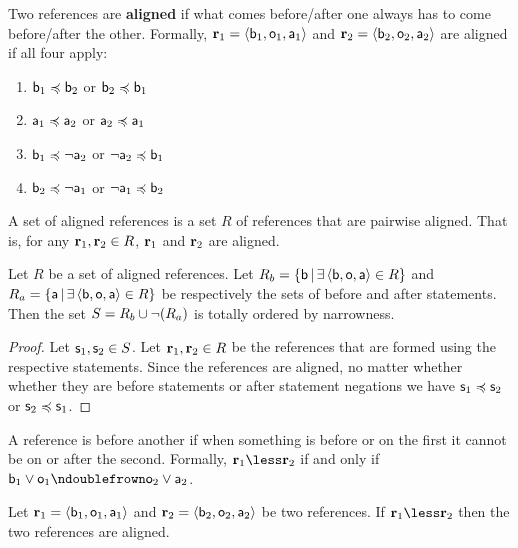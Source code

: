 \documentclass[11pt,letterpaper,fleqn]{memoir} %
\begin{document}
\begin{mathSection}
	\begin{defn}
		Two references are \textbf{aligned} if what comes before/after one always has to come before/after the other. Formally, $\refStmt_1 = \langle \stmt[b]_1, \stmt[o]_1, \stmt[a]_1 \rangle$ and $\refStmt_2 = \langle \stmt[b]_2, \stmt[o]_2, \stmt[a]_2 \rangle$ are aligned if all four apply:
		\begin{enumerate}
			\item $\stmt[b]_1 \narrower \stmt[b]_2$ or $\stmt[b]_2 \narrower \stmt[b]_1$
			\item $\stmt[a]_1 \narrower \stmt[a]_2$ or $\stmt[a]_2 \narrower \stmt[a]_1$
			\item $\stmt[b]_1 \narrower \NOT\stmt[a]_2$ or $\NOT\stmt[a]_2 \narrower \stmt[b]_1$
			\item $\stmt[b]_2 \narrower \NOT\stmt[a]_1$ or $\NOT\stmt[a]_1 \narrower \stmt[b]_2$
		\end{enumerate}
		A set of aligned references is a set $R$ of references that are pairwise aligned. That is, for any $\refStmt_1, \refStmt_2 \in R$, $\refStmt_1$ and $\refStmt_2$ are aligned.
	\end{defn}
\begin{coro}\label{3_prop_alignment_is_ordering}
	Let $R$ be a set of aligned references. Let $R_b = \{\stmt[b] \, | \, \exists \, \langle \stmt[b], \stmt[o], \stmt[a] \rangle \in R \}$ and $R_a = \{\stmt[a] \, | \, \exists \, \langle \stmt[b], \stmt[o], \stmt[a] \rangle \in R \}$ be respectively the sets of before and after statements. Then the set $S = R_b \cup \NOT (R_a)$ is totally ordered by narrowness.
\end{coro}
\begin{proof}
	Let $\stmt_1, \stmt_2 \in S$. Let $\refStmt_1, \refStmt_2 \in R$ be the references that are formed using the respective statements. Since the references are aligned, no matter whether whether they are before statements or after statement negations we have $\stmt_1 \narrower \stmt_2$ or $\stmt_2 \narrower \stmt_1$.
\end{proof}
	\begin{defn}
	A reference is before another if when something is before or on the first it cannot be on or after the second. Formally, $\refStmt_1 \less \refStmt_2$ if and only if $\stmt[b]_1 \OR \stmt[o]_1 \ncomp \stmt[o]_2 \OR \stmt[a]_2$.
\end{defn}
	\begin{prop}
	Let $\refStmt_1 = \langle \stmt[b]_1, \stmt[o]_1, \stmt[a]_1 \rangle$ and $\refStmt_2 = \langle \stmt[b]_2, \stmt[o]_2, \stmt[a]_2 \rangle$ be two references. If $\refStmt_1 \less \refStmt_2$ then the two references are aligned.

\end{prop}
\end{mathSection}
\end{document}
